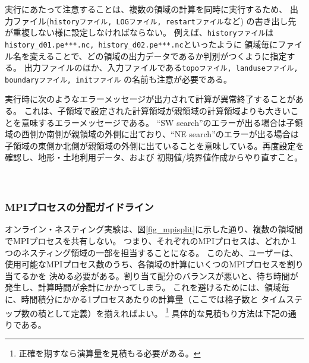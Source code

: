 実行にあたって注意することは、複数の領域の計算を同時に実行するため、
出力ファイル(\verb|historyファイル, LOGファイル, restartファイル|など) の書き出し先が重複しない様に設定しなければならない。
例えば、\verb|historyファイル|は\verb|history_d01.pe***.nc, history_d02.pe***.nc|といったように
領域毎にファイル名を変えることで、どの領域の出力データであるか判別がつくように指定する。
出力ファイルのほか、入力ファイルである\verb|topoファイル, landuseファイル, boundaryファイル, initファイル|
の名前も注意が必要である。

実行時に次のようなエラーメッセージが出力されて計算が異常終了することがある。
これは、子領域で設定された計算領域が親領域の計算領域よりも大きいことを意味するエラーメッセージである。
``SW search''のエラーが出る場合は子領域の西側か南側が親領域の外側に出ており、``NE search''のエラーが出る場合は
子領域の東側か北側が親領域の外側に出ていることを意味している。再度設定を確認し、地形・土地利用データ、および
初期値/境界値作成からやり直すこと。\\


\\

\\



\subsubsection{MPIプロセスの分配ガイドライン}
オンライン・ネスティング実験は、図\ref{fig_mpisplit}に示した通り、複数の領域間でMPIプロセスを共有しない。
つまり、それぞれのMPIプロセスは、どれか１つのネスティング領域の一部を担当することになる。
このため、ユーザーは、使用可能なMPIプロセス数のうち、各領域の計算にいくつのMPIプロセスを割り当てるかを
決める必要がある。割り当て配分のバランスが悪いと、待ち時間が発生し、計算時間が余計にかかってしまう。
これを避けるためには、領域毎に、時間積分にかかる1プロセスあたりの計算量（ここでは格子数と
タイムステップ数の積として定義）を揃えればよい。
\footnote{正確を期すなら演算量を見積もる必要がある。}
具体的な見積もり方法は下記の通りである。

